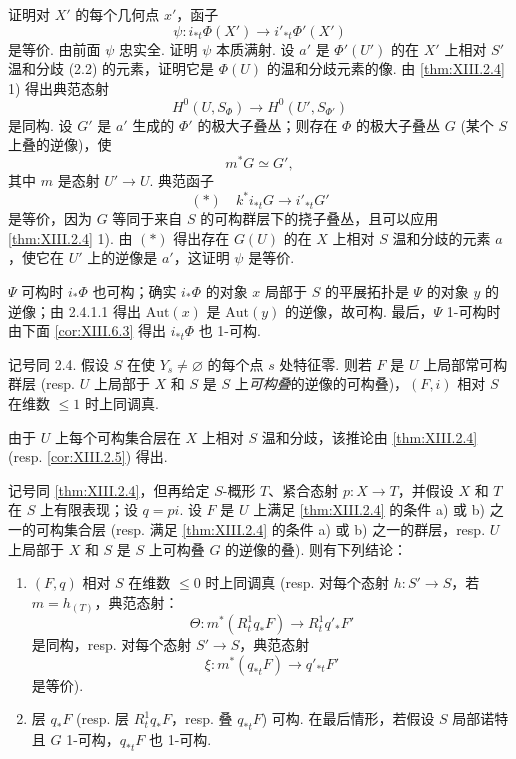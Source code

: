 证明对 $X'$ 的每个几何点 $x'$，函子
\[
\psi \colon i_{*t} \Phi(X') \longrightarrow i'_{*t} \Phi'(X')
\]
是等价. 由前面 $\psi$ 忠实全. 证明 $\psi$ 本质满射. 设 $a'$ 是 $\Phi'(U')$ 的在 $X'$ 上相对 $S'$ 温和分歧 (2.2) 的元素，证明它是 $\Phi(U)$ 的温和分歧元素的像. 由 \ref{thm:XIII.2.4} 1) 得出典范态射
\[
H^0(U, S_\Phi) \longrightarrow H^0(U', S_{\Phi'})
\]
是同构. 设 $G'$ 是 $a'$ 生成的 $\Phi'$ 的极大子叠丛；则存在 $\Phi$ 的极大子叠丛 $G$ (某个 $S$ 上叠的逆像)，使
\[
m^{*} G \simeq G',
\]
其中 $m$ 是态射 $U' \to U$. 典范函子
\[
(\ast) \quad k^{*} i_{*t} G \longrightarrow i'_{*t} G'
\]
是等价，因为 $G$ 等同于来自 $S$ 的可构群层下的挠子叠丛，且可以应用 \ref{thm:XIII.2.4} 1). 由 $(\ast)$ 得出存在 $G(U)$ 的在 $X$ 上相对 $S$ 温和分歧的元素 $a$，使它在 $U'$ 上的逆像是 $a'$，这证明 $\psi$ 是等价.

$\Psi$ 可构时 $i_* \Phi$ 也可构；确实 $i_* \Phi$ 的对象 $x$ 局部于 $S$ 的平展拓扑是 $\Psi$ 的对象 $y$ 的逆像；由 2.4.1.1 得出 $\mathrm{Aut}(x)$ 是 $\mathrm{Aut}(y)$ 的逆像，故可构. 最后，$\Psi$ 1-可构时由下面 \ref{cor:XIII.6.3} 得出 $i_{*t} \Phi$ 也 1-可构.

\begin{corollary}\label{cor:XIII.2.6}
记号同 2.4. 假设 $S$ 在使 $Y_s \neq \varnothing$ 的每个点 $s$ 处特征零. 则若 $F$ 是 $U$ 上局部常可构群层 (resp. $U$ 上局部于 $X$ 和 $S$ 是 $S$ 上\emph{可构叠}的逆像的可构叠)，$(F, i)$ 相对 $S$ 在维数 $\leqslant 1$ 时上同调真.
\end{corollary}

由于 $U$ 上每个可构集合层在 $X$ 上相对 $S$ 温和分歧，该推论由 \ref{thm:XIII.2.4} (resp. \ref{cor:XIII.2.5}) 得出.

\begin{corollary}\label{cor:XIII.2.7}
记号同 \ref{thm:XIII.2.4}，但再给定 $S$-概形 $T$、紧合态射 $p \colon X \to T$，并假设 $X$ 和 $T$ 在 $S$ 上有限表现；设 $q = pi$. 设 $F$ 是 $U$ 上满足 \ref{thm:XIII.2.4} 的条件 a) 或 b) 之一的可构集合层 (resp. 满足 \ref{thm:XIII.2.4} 的条件 a) 或 b) 之一的群层，resp. $U$ 上局部于 $X$ 和 $S$ 是 $S$ 上可构叠 $G$ 的逆像的叠). 则有下列结论：
\begin{enumerate}[1)]
\item $(F, q)$ 相对 $S$ 在维数 $\leqslant 0$ 时上同调真 (resp. 对每个态射 $h \colon S' \to S$，若 $m = h_{(T)}$，典范态射：
\[
\Theta \colon m^{*}(R^1_t q_* F) \longrightarrow R^1_t q'_* F'
\]
是同构，resp. 对每个态射 $S' \to S$，典范态射
\[
\xi \colon m^{*}(q_{*t} F) \longrightarrow q'_{*t} F'
\]
是等价).
\item 层 $q_* F$ (resp. 层 $R^1_t q_* F$，resp. 叠 $q_{*t} F$) 可构. 在最后情形，若假设 $S$ 局部诺特且 $G$ 1-可构，$q_{*t} F$ 也 1-可构.
\end{enumerate}
\end{corollary}


